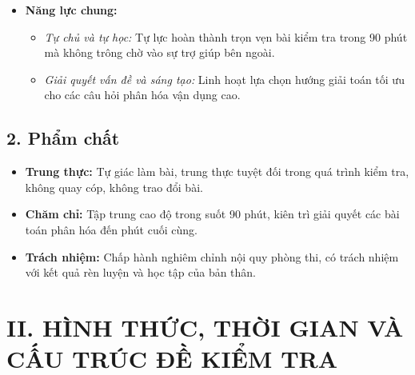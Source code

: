 \documentclass[12pt, a4paper]{article}
\begin{document}
\begin{itemize}[leftmargin=1.2cm]
    \item \textbf{Năng lực chung:}
    \begin{itemize}[leftmargin=0.6cm]
        \item \textit{Tự chủ và tự học:} Tự lực hoàn thành trọn vẹn bài kiểm tra trong 90 phút mà không trông chờ vào sự trợ giúp bên ngoài.
        \item \textit{Giải quyết vấn đề và sáng tạo:} Linh hoạt lựa chọn hướng giải toán tối ưu cho các câu hỏi phân hóa vận dụng cao.
    \end{itemize}
\end{itemize}

\subsection*{2. Phẩm chất}

\begin{itemize}[leftmargin=1.2cm]
    \item \textbf{Trung thực:} Tự giác làm bài, trung thực tuyệt đối trong quá trình kiểm tra, không quay cóp, không trao đổi bài.
    \item \textbf{Chăm chỉ:} Tập trung cao độ trong suốt 90 phút, kiên trì giải quyết các bài toán phân hóa đến phút cuối cùng.
    \item \textbf{Trách nhiệm:} Chấp hành nghiêm chỉnh nội quy phòng thi, có trách nhiệm với kết quả rèn luyện và học tập của bản thân.
\end{itemize}

\vspace{5pt}

\section*{II. HÌNH THỨC, THỜI GIAN VÀ CẤU TRÚC ĐỀ KIỂM TRA}
\end{document}
